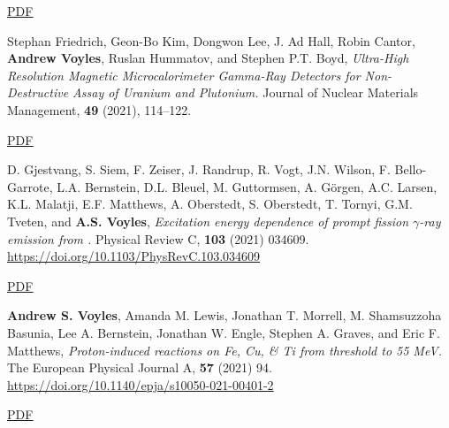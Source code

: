 \begin{bibsection}
\ifshort \vspace{0.1cm} \href{https://avoyles.github.io/papers/Fox2021_As.pdf}{\underline{PDF}} \else  \fi 


\item Stephan Friedrich, Geon-Bo Kim, Dongwon Lee, J. Ad Hall, Robin Cantor, \textbf{Andrew Voyles}, Ruslan Hummatov, and Stephen P.T. Boyd, \emph{Ultra-High Resolution Magnetic Microcalorimeter Gamma-Ray Detectors for Non-Destructive Assay of Uranium and Plutonium.} Journal of Nuclear Materials Management, \textbf{49} (2021), 114--122. 

\ifshort \vspace{0.1cm} \href{https://avoyles.github.io/papers/Friedrich2021_MMC.pdf}{\underline{PDF}} \else  \fi 

\item D. Gjestvang, S. Siem, F. Zeiser, J. Randrup, R. Vogt, J.N. Wilson, F. Bello-Garrote, L.A. Bernstein, D.L. Bleuel, M. Guttormsen, A. Görgen, A.C. Larsen, K.L. Malatji, E.F. Matthews, A. Oberstedt, S. Oberstedt, T. Tornyi, G.M. Tveten, and \textbf{A.S. Voyles}, \emph{Excitation energy dependence of prompt fission $\gamma$-ray emission from  .} Physical Review C, \textbf{103} (2021) 034609. \url{https://doi.org/10.1103/PhysRevC.103.034609} 

\ifshort \vspace{0.1cm} \href{https://avoyles.github.io/papers/Gjestvang2021_241Pu.pdf}{\underline{PDF}} \else  \fi 


\item \textbf{Andrew S. Voyles}, Amanda M. Lewis, Jonathan T. Morrell, M. Shamsuzzoha Basunia, Lee A. Bernstein, Jonathan W. Engle, Stephen A. Graves, and Eric F. Matthews, \emph{Proton-induced reactions on Fe, Cu, \& Ti from threshold to 55 MeV.} The European Physical Journal A, \textbf{57} (2021) 94. \url{https://doi.org/10.1140/epja/s10050-021-00401-2} 

\ifshort \vspace{0.1cm} \href{https://avoyles.github.io/papers/Voyles2021_Fe_px.pdf}{\underline{PDF}} \else  \fi 



\end{bibsection}
